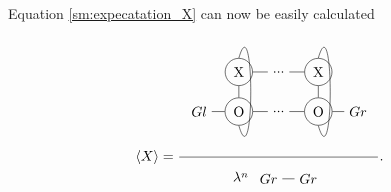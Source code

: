 Equation \cref{sm:expecatation_X} can now be easily calculated
\begin{equation}
    \Braket{X} = \frac{
        \begin{tikzpicture} [   ]
            \clip (-0.5,-1) rectangle (4.5,2);

            \node[] (N1) at (0,0) {$Gl$};
            \node[circle, draw] (N2) at (1,0) {O};
            \node[circle, draw] (X2) at (1,1) {X};

            \node[] (N3) at (2 ,0) {...};
            \node[] (X3) at (2,1) {...};

            \node[circle, draw] (N4) at (3 ,0) {O};
            \node[circle, draw] (X4) at (3,1) {X};

            \node[] (N5) at (4 ,0) {$Gr$};

            \draw  (N1) -- (N2) ;
            \draw  (N2) -- (N3) ;
            \draw  (N3) -- (N4) ;
            \draw  (N4) -- (N5) ;

            \draw  (X2) -- (X3) ;
            \draw  (X3) -- (X4) ;

            \draw  (N2) -- (X2) ;
            \draw  (N4) -- (X4) ;

            \draw (X2.north)   .. controls +(0.4,1.4) and +(0.4,-1.4) .. (N2.south);
            \draw (X4.north)   .. controls +(0.4,1.4) and +(0.4,-1.4) .. (N4.south);

        \end{tikzpicture}
    }{
        \lambda^n
        \begin{tikzpicture}[baseline={0cm-0.5*height("$=$")} ]
            \clip (-0.5,-0.5) rectangle (1.4,0.5);
            \node[] (N2) at (1,0) {$Gr$};
            \node[] (N1) at (0,0) {$Gr$};
            \draw  (N1) -- (N2) ;
        \end{tikzpicture}
    } .
    \label{sm:expecatation_X_2}
\end{equation}


